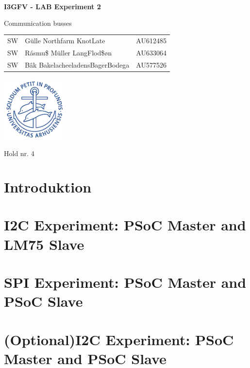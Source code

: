 \documentclass{article}
\begin{document}

\begin{titlepage}
    
  \begin{center}
    \vspace*{1cm}

    \Huge
    \textbf{I3GFV - LAB Experiment 2}

    \vspace{0.5cm}
    \huge
    Communication busses \\
    \date\today

    \vspace{3cm}

    \Large
    \begin{tabular}{l|l|r}
      SW & Gülle Northfarm KnotLate & AU612485 \\
      SW & Rásmu\$ Müller LangFlod\$øn & AU633064\\
      SW & Bâk BakelacheeladensBagerBodega & AU577526 \\
    \end{tabular}
    \vfill
    \includegraphics[width=0.25\textwidth]{au2}
    \vspace{2cm}

    Hold nr. 4

  \end{center}
\end{titlepage}

\newpage

\tableofcontents

\newpage

\setcounter{page}{1}


\section{Introduktion}

\section{I2C Experiment: PSoC Master and LM75 Slave}



\section{SPI Experiment: PSoC Master and PSoC Slave}



\section{(Optional)I2C Experiment: PSoC Master and PSoC Slave }
\end{document}
